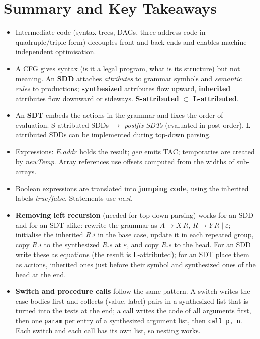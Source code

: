 \documentclass[11pt,a4paper]{article}
\newcommand{\at}[2]{\ensuremath{#1.\mathit{#2}}}
\begin{document}
\section{Summary and Key Takeaways}

\begin{itemize}
\item Intermediate code (syntax trees, DAGs, three-address code in quadruple/triple form) decouples front and back ends and enables machine-independent optimisation.
\item A CFG gives syntax (is it a legal program, what is its structure) but not meaning. An \textbf{SDD} attaches \emph{attributes} to grammar symbols and \emph{semantic rules} to productions; \textbf{synthesized} attributes flow upward, \textbf{inherited} attributes flow downward or sideways. \textbf{S-attributed} $\subset$ \textbf{L-attributed}.
\item An \textbf{SDT} embeds the actions in the grammar and fixes the order of evaluation. S-attributed SDDs $\to$ \emph{postfix SDTs} (evaluated in post-order). L-attributed SDDs can be implemented during top-down parsing.
\item Expressions: \at{E}{addr} holds the result; \textit{gen} emits TAC; temporaries are created by \textit{newTemp}. Array references use offsets computed from the widths of sub-arrays.
\item Boolean expressions are translated into \textbf{jumping code}, using the inherited labels \textit{true/false}. Statements use \textit{next}.
\item \textbf{Removing left recursion} (needed for top-down parsing) works for an SDD and for an SDT alike: rewrite the grammar as $A\to X\,R$, $R\to Y\,R\mid\varepsilon$; initialise the inherited $R.i$ in the base case, update it in each repeated group, copy $R.i$ to the synthesized $R.s$ at $\varepsilon$, and copy $R.s$ to the head. For an SDD write these as equations (the result is L-attributed); for an SDT place them as actions, inherited ones just before their symbol and synthesized ones of the head at the end.
\item \textbf{Switch and procedure calls} follow the same pattern. A switch writes the case bodies first and collects (value, label) pairs in a synthesized list that is turned into the tests at the end; a call writes the code of all arguments first, then one \texttt{param} per entry of a synthesized argument list, then \texttt{call p, n}. Each switch and each call has its own list, so nesting works.

\end{itemize}
\end{document}
